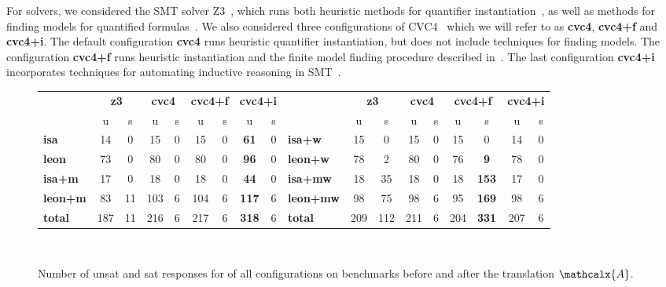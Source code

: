 \documentclass[runningheads,a4paper]{llncs}
\newcommand\cvc{CVC4\xspace}
\newcommand\ziii{Z3\xspace}
\newcommand{\conv}{\mathcalx{A}}
\begin{document}
For solvers, we considered the SMT solver \ziii~\cite{de-moura-bjoerner-2008},
which runs both heuristic methods for quantifier instantiation~\cite{DBLP:conf/cade/MouraB07},
as well as methods for finding models for quantified formulas~\cite{GeDeM-CAV-09}.
We also considered three configurations of \cvc~\cite{barrett-et-al-2011} which we will refer to as {\bf cvc4}, {\bf cvc4+f} and {\bf cvc4+i}.
The default configuration {\bf cvc4} runs heuristic quantifier instantiation,
but does not include techniques for finding models.
The configuration {\bf cvc4+f} runs heuristic instantiation and the finite model finding procedure described in~\cite{ReyEtAl-1-RR-13, reynolds-et-al-2013}.
The last configuration {\bf cvc4+i} incorporates techniques for automating inductive reasoning in SMT~\cite{reynolds-kuncak-2015}.

\begin{figure}[t]
\centering
{
\begin{tabular}{|l|cc|cc|cc|cc|l|cc|cc|cc|cc|}
\hline
  & \multicolumn{2}{c|}{{\bf z3}}     & \multicolumn{2}{c|}{{\bf cvc4}}     & \multicolumn{2}{c|}{{\bf cvc4+f}}     & \multicolumn{2}{c|}{{\bf cvc4+i}}     & & \multicolumn{2}{c|}{{\bf z3}}     & \multicolumn{2}{c|}{{\bf cvc4}}     & \multicolumn{2}{c|}{{\bf cvc4+f}}     & \multicolumn{2}{c|}{{\bf cvc4+i}}
\\
  & u & s & u & s & u & s & u & s & & u & s & u & s & u & s & u & s
\\
\hline
{\bf isa} & 14  & 0 & 15  & 0 & 15  & 0 & {\bf 61}  & 0 & {\bf isa+w} & 15  & 0 & 15  & 0 & 15  & 0 & 14  & 0
\\
{\bf leon}  & 73  & 0 & 80  & 0 & 80  & 0 & {\bf 96}  & 0 & {\bf leon+w}  & 78  & 2 & 80  & 0 & 76  & {\bf 9} & 78  & 0
\\
{\bf isa+m} & 17  & 0 & 18  & 0 & 18  & 0 & {\bf 44}  & 0 & {\bf isa+mw}  & 18  & 35  & 18  & 0 & 18  & {\bf 153} & 17  & 0
\\
{\bf leon+m}  & 83  & 11  & 103 & 6 & 104 & 6 & {\bf 117} & 6 & {\bf leon+mw} & 98  & 75  & 98  & 6 & 95  & {\bf 169} & 98  & 6
\\
\hline
{\bf total} & 187 & 11  & 216 & 6 & 217 & 6 & {\bf 318} & 6 & {\bf total} & 209 & 112 & 211 & 6 & 204 & {\bf 331} & 207 & 6
\\
\hline
\end{tabular}
\\
}
\caption{Number of unsat and sat responses for of all configurations on benchmarks
before and after the translation $\conv$.}
\label{fig:results}
\end{figure}
\end{document}

